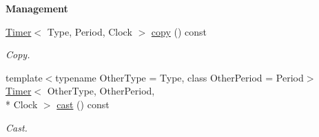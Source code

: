 \begin{Indent}{\bf Management}\par
\begin{DoxyCompactItemize}
\item 
\hyperlink{exceptionmagrathea_1_1Timer}{Timer}$<$ Type, Period, Clock $>$ \hyperlink{exceptionmagrathea_1_1Timer_aaf4f6405126d6324cdbc4c67884c23bf}{copy} () const 
\begin{DoxyCompactList}\small\item\em Copy. \end{DoxyCompactList}\item 
{\footnotesize template$<$typename Other\-Type  = Type, class Other\-Period  = Period$>$ }\\\hyperlink{exceptionmagrathea_1_1Timer}{Timer}$<$ Other\-Type, Other\-Period, \\*
Clock $>$ \hyperlink{exceptionmagrathea_1_1Timer_ac0c22623a1a2f0180781e67ba44f9988}{cast} () const 
\begin{DoxyCompactList}\small\item\em Cast. \end{DoxyCompactList}\end{DoxyCompactItemize}
\end{Indent}
